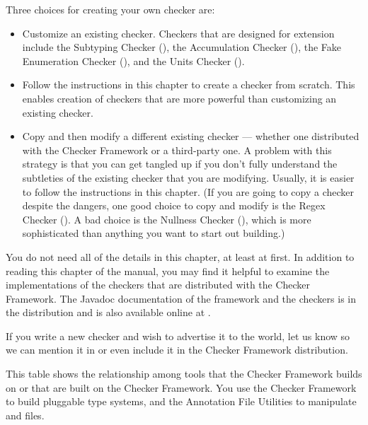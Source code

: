 Three choices for creating your own checker are:
\begin{itemize}
\item
  Customize an existing checker.
  Checkers that are designed for extension include
  the Subtyping Checker (),
  the Accumulation Checker (),
  the Fake Enumeration Checker (),
  and the Units Checker ().
\item
  Follow the instructions in this chapter to create a checker from scratch.
  This enables creation of checkers that are more powerful than customizing
  an existing checker.
\item
  Copy and then modify a different existing checker --- whether
  one distributed with the Checker Framework or a third-party one.
  A problem with this strategy is that you can get tangled up if you don't fully understand
  the subtleties of the existing checker that you are modifying.
  Usually, it is easier to follow the instructions in this chapter.
  (If you are going to copy a checker despite the dangers, one good choice to copy and modify
  is the Regex Checker ().  A bad choice is
  the Nullness Checker (),
  which is more sophisticated than anything you want to start out building.)
\end{itemize}

You do not need all of the details in this chapter, at least at first.
In addition to reading this chapter of the manual, you may find it helpful
to examine the implementations of the checkers that are distributed with
the Checker Framework.
The Javadoc documentation of the framework and the checkers is in the
distribution and is also available online at
.

If you write a new checker and wish to advertise it to the world, let us
know so we can mention it in 
or even include it in the Checker Framework distribution.



This table shows the relationship among tools that the Checker Framework
builds on or that are built on the Checker Framework.
You use the Checker Framework to build pluggable type systems, and the
Annotation File Utilities to manipulate  and  files.

